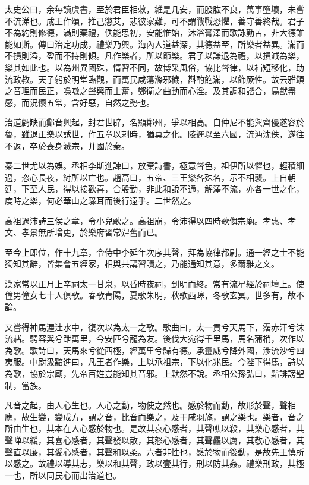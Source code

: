 太史公曰，余每讀虞書，至於君臣相敕，維是几安，而股肱不良，萬事墮壞，未嘗不流涕也。成王作頌，推己懲艾，悲彼家難，可不謂戰戰恐懼，善守善終哉。君子不為約則修德，滿則棄禮，佚能思初，安能惟始，沐浴膏澤而歌詠勤苦，非大德誰能如斯。傳曰治定功成，禮樂乃興。海內人道益深，其德益至，所樂者益異。滿而不損則溢，盈而不持則傾。凡作樂者，所以節樂。君子以謙退為禮，以損減為樂，樂其如此也。以為州異國殊，情習不同，故博采風俗，協比聲律，以補短移化，助流政教。天子躬於明堂臨觀，而萬民咸蕩滌邪穢，斟酌飽滿，以飾厥性。故云雅頌之音理而民正，嘄噭之聲興而士奮，鄭衛之曲動而心淫。及其調和諧合，鳥獸盡感，而況懷五常，含好惡，自然之勢也。

治道虧缺而鄭音興起，封君世辟，名顯鄰州，爭以相高。自仲尼不能與齊優遂容於魯，雖退正樂以誘世，作五章以剌時，猶莫之化。陵遲以至六國，流沔沈佚，遂往不返，卒於喪身滅宗，并國於秦。

秦二世尤以為娛。丞相李斯進諫曰，放棄詩書，極意聲色，祖伊所以懼也，輕積細過，恣心長夜，紂所以亡也。趙高曰，五帝、三王樂各殊名，示不相襲。上自朝廷，下至人民，得以接歡喜，合殷勤，非此和說不通，解澤不流，亦各一世之化，度時之樂，何必華山之騄耳而後行遠乎。二世然之。

高祖過沛詩三侯之章，令小兒歌之。高祖崩，令沛得以四時歌儛宗廟。孝惠、孝文、孝景無所增更，於樂府習常肄舊而已。

至今上即位，作十九章，令侍中李延年次序其聲，拜為協律都尉。通一經之士不能獨知其辭，皆集會五經家，相與共講習讀之，乃能通知其意，多爾雅之文。

漢家常以正月上辛祠太一甘泉，以昏時夜祠，到明而終。常有流星經於祠壇上。使僮男僮女七十人俱歌。春歌青陽，夏歌朱明，秋歌西暤，冬歌玄冥。世多有，故不論。

又嘗得神馬渥洼水中，復次以為太一之歌。歌曲曰，太一貢兮天馬下，霑赤汗兮沫流赭。騁容與兮跇萬里，今安匹兮龍為友。後伐大宛得千里馬，馬名蒲梢，次作以為歌。歌詩曰，天馬來兮從西極，經萬里兮歸有德。承靈威兮降外國，涉流沙兮四夷服。中尉汲黯進曰，凡王者作樂，上以承祖宗，下以化兆民。今陛下得馬，詩以為歌，協於宗廟，先帝百姓豈能知其音邪。上默然不說。丞相公孫弘曰，黯誹謗聖制，當族。

凡音之起，由人心生也。人心之動，物使之然也。感於物而動，故形於聲，聲相應，故生變，變成方，謂之音，比音而樂之，及干戚羽旄，謂之樂也。樂者，音之所由生也，其本在人心感於物也。是故其哀心感者，其聲噍以殺，其樂心感者，其聲啴以緩，其喜心感者，其聲發以散，其怒心感者，其聲麤以厲，其敬心感者，其聲直以廉，其愛心感者，其聲和以柔。六者非性也，感於物而後動，是故先王慎所以感之。故禮以導其志，樂以和其聲，政以壹其行，刑以防其姦。禮樂刑政，其極一也，所以同民心而出治道也。

